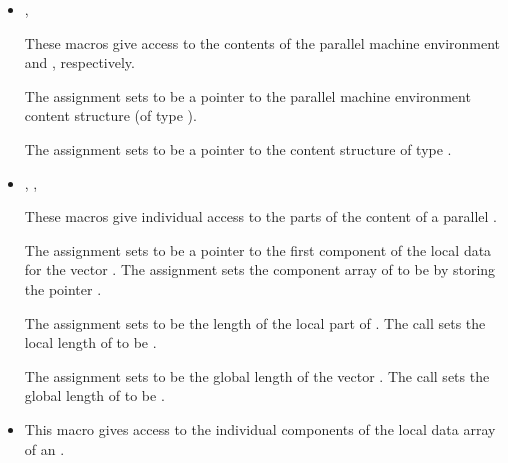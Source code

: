 \begin{itemize}

\item {}, 

      These macros give access to the contents of the parallel
      machine environment and , respectively.           
                                                               
      The assignment  sets       
       to be a pointer to the parallel machine             
      environment content structure (of type ).

      The assignment  sets       
       to be a pointer to the  content    
      structure of type .

\item {}, , 

      These macros give individual access to the parts of    
      the content of a parallel .                        
                                                               
      The assignment  sets  to be     
      a pointer to the first component of the local data for the vector . 
      The assignment  sets the component array of 
       to be  by storing the pointer .                   
                                                               
      The assignment  sets  to be     
      the length of the local part of . 
      The call  sets      
      the local length of  to be .

      The assignment  sets  to  
      be the global length of the vector .                    
      The call  sets the global       
      length of  to be .

\item {}

      This macro gives access to the individual components of the local data
      array of an .


\end{itemize}
